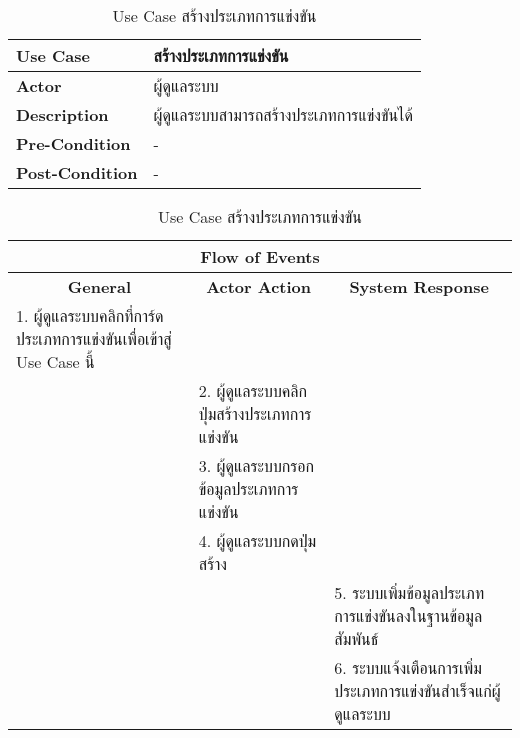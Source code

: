 \begin{table}[H]
    \caption{Use Case สร้างประเภทการแข่งขัน}
    \label{tab:use-case-create-contest}
    \begin{tabularx}{\textwidth}{ | p{3cm} | X | }
    \hline
    \textbf{Use Case} & สร้างประเภทการแข่งขัน \\
    \hline
    \textbf{Actor} & ผู้ดูแลระบบ \\
    \hline
    \textbf{Description} & ผู้ดูแลระบบสามารถสร้างประเภทการแข่งขันได้ \\
    \hline
    \textbf{Pre-Condition} & - \\
    \hline
    \textbf{Post-Condition} & - \\
    \hline
    \end{tabularx}
    \begin{tabularx}{\textwidth}{ | X | X | X | }
    \multicolumn{3}{|c|}{\textbf{Flow of Events}} \\
    \hline
    \multicolumn{1}{|c|}{\textbf{General}} & \multicolumn{1}{|c|}{\textbf{Actor Action}} & \multicolumn{1}{|c|}{\textbf{System Response}} \\
    \hline
    1. ผู้ดูแลระบบคลิกที่การ์ดประเภทการแข่งขันเพื่อเข้าสู่ Use Case นี้ &  &  \\
    \hline
    & 2. ผู้ดูแลระบบคลิกปุ่มสร้างประเภทการแข่งขัน  &  \\
    \hline
    & 3. ผู้ดูแลระบบกรอกข้อมูลประเภทการแข่งขัน  &  \\
    \hline
    & 4. ผู้ดูแลระบบกดปุ่มสร้าง &  \\
    \hline
    & & 5. ระบบเพิ่มข้อมูลประเภทการแข่งขันลงในฐานข้อมูลสัมพันธ์ \\
    \hline
    & & 6. ระบบแจ้งเตือนการเพิ่มประเภทการแข่งขันสำเร็จแก่ผู้ดูแลระบบ \\
    \hline
    \end{tabularx}
\end{table}
